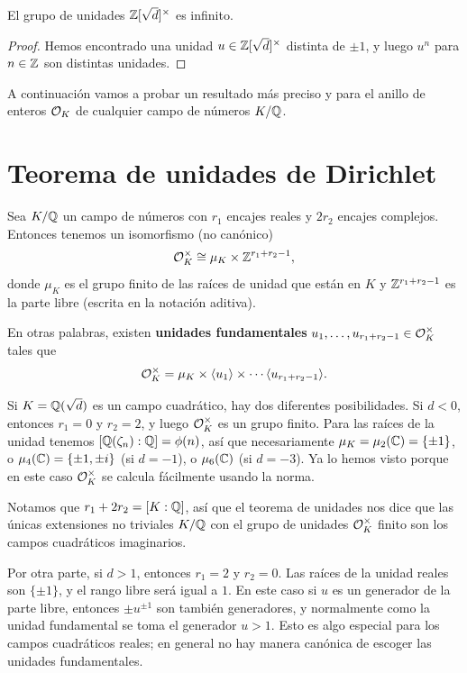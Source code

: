 \begin{corolario}
  El grupo de unidades $\mathbb{Z} [\sqrt{d}]^\times$ es infinito.

  \begin{proof}
    Hemos encontrado una unidad $u \in \mathbb{Z} [\sqrt{d}]^\times$ distinta de
    $\pm 1$, y luego $u^n$ para $n \in \mathbb{Z}$ son distintas unidades.
  \end{proof}
\end{corolario}

A continuación vamos a probar un resultado más preciso y para el anillo de
enteros $\mathcal{O}_K$ de cualquier campo de números $K/\mathbb{Q}$.


\section{Teorema de unidades de Dirichlet}
\label{sec:teorema-de-unidades}

\begin{teorema}
  Sea $K/\mathbb{Q}$ un campo de números con $r_1$ encajes reales y $2 r_2$ encajes
  complejos. Entonces tenemos un isomorfismo (no canónico)
  $$\mathcal{O}_K^\times \cong \mu_K \times \mathbb{Z}^{r_1 + r_2 - 1},$$
  donde $\mu_K$ es el grupo finito de las raíces de unidad que están en $K$ y
  $\mathbb{Z}^{r_1 + r_2 - 1}$ es la parte libre (escrita en la notación aditiva).
\end{teorema}

En otras palabras, existen \textbf{unidades fundamentales}
$u_1,\ldots,u_{r_1+r_2-1} \in \mathcal{O}_K^\times$ tales que
$$\mathcal{O}_K^\times = \mu_K \times \langle u_1\rangle\times \cdots \langle u_{r_1+r_2-1}\rangle.$$

\begin{ejemplo}
  Si $K = \mathbb{Q} (\sqrt{d})$ es un campo cuadrático, hay dos diferentes
  posibilidades. Si $d < 0$, entonces $r_1 = 0$ y $r_2 = 2$, y luego
  $\mathcal{O}_K^\times$ es un grupo finito. Para las raíces de la unidad tenemos
  $[\mathbb{Q} (\zeta_n) : \mathbb{Q}] = \phi (n)$, así que necesariamente
  $\mu_K = \mu_2 (\mathbb{C}) = \{ \pm 1 \}$, o
  $\mu_4 (\mathbb{C}) = \{ \pm 1, \pm i \}$ (si $d = -1$), o $\mu_6 (\mathbb{C})$
  (si $d = -3$). Ya lo hemos visto porque en este caso $\mathcal{O}_K^\times$ se calcula
  fácilmente usando la norma.

  Notamos que $r_1 + 2 r_2 = [K : \mathbb{Q}]$, así que el teorema de unidades nos dice
  que las únicas extensiones no triviales $K/\mathbb{Q}$ con el grupo de unidades
  $\mathcal{O}_K^\times$ finito son los campos cuadráticos imaginarios.

  Por otra parte, si $d > 1$, entonces $r_1 = 2$ y $r_2 = 0$. Las raíces de la
  unidad reales son $\{ \pm 1 \}$, y el rango libre será igual a $1$. En este
  caso si $u$ es un generador de la parte libre, entonces $\pm u^{\pm 1}$ son
  también generadores, y normalmente como la unidad fundamental se toma el
  generador $u > 1$. Esto es algo especial para los campos cuadráticos reales;
  en general no hay manera canónica de escoger las unidades fundamentales.
\end{ejemplo}

